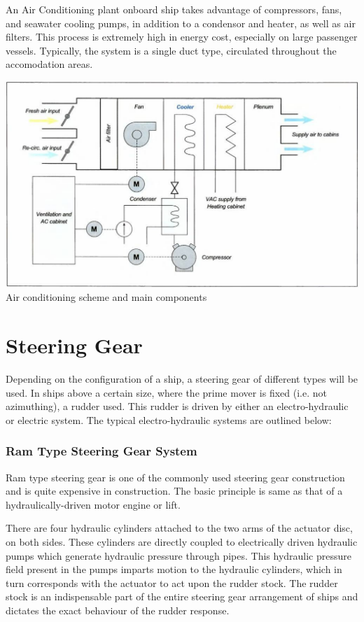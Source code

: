 \documentclass[11pt,a4paper]{article}
\begin{document}
An Air Conditioning plant onboard ship takes advantage of compressors, fans, and seawater cooling pumps, in addition to a condensor and heater, as well as air filters. This process is extremely high in energy cost, especially on large passenger vessels. Typically, the system is a single duct type, circulated throughout the accomodation areas.\cite[p. 108]{e11}
\begin{center}
\includegraphics[width=\textwidth]{hallac.png}
Air conditioning scheme and main components
\end{center}
\section{Steering Gear}
Depending on the configuration of a ship, a steering gear of different types will be used. In ships above a certain size, where the prime mover is fixed (i.e. not azimuthing), a rudder used. This rudder is driven by either an electro-hydraulic or electric system. The typical electro-hydraulic systems are outlined below:

\subsubsection{Ram Type Steering Gear System}
Ram type steering gear is one of the commonly used steering gear construction and is quite expensive in construction. The basic principle is same as that of a hydraulically-driven motor engine or lift.

There are four hydraulic cylinders attached to the two arms of the actuator disc, on both sides. These cylinders are directly coupled to electrically driven hydraulic pumps which generate hydraulic pressure through pipes. This hydraulic pressure field present in the pumps imparts motion to the hydraulic cylinders, which in turn corresponds with the actuator to act upon the rudder stock. The rudder stock is an indispensable part of the entire steering gear arrangement of ships and dictates the exact behaviour of the rudder response.
\end{document}
